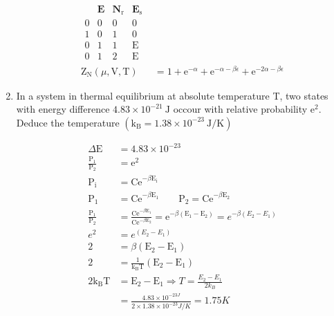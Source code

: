 \begin{enumerate}
 \begin{answer}
 	\begin{align*}
 	\begin{array}{llll} & \mathbf{E} & \mathbf{N}_{\mathrm{r}} & \mathbf{E}_{\mathrm{s}} \\ 0 & 0 & 0 & 0 \\ 1 & 0 & 1 & 0 \\ 0 & 1 & 1 & \mathrm{E} \\ 0 & 1 & 2 & \mathrm{E}\end{array}\\
 	\mathrm{Z}_{\mathrm{N}}(\mu, \mathrm{V}, \mathrm{T})&=1+\mathrm{e}^{-\alpha}+\mathrm{e}^{-\alpha-\beta \epsilon}+\mathrm{e}^{-2 \alpha-\beta \epsilon}
 	\end{align*}
 \end{answer}
	\item In a system in thermal equilibrium at absolute temperature T, two states with energy difference $4.83 \times 10^{-21} \mathrm{~J}$ occour with relative probability $\mathrm{e}^{2}$. Deduce the temperature $\left(\mathrm{k}_{\mathrm{B}}=1.38 \times 10^{-23} \mathrm{~J} / \mathrm{K}\right)$
	\begin{answer}
		\begin{align*}
		\Delta \mathrm{E}&=4.83 \times 10^{-23}\\
		\frac{\mathrm{P}_{1}}{\mathrm{P}_{2}}&=\mathrm{e}^{2}\\
		\mathrm{P}_{\mathrm{i}}&=\mathrm{Ce}^{-\beta \mathrm{E}_{\mathrm{i}}}\\
		\mathrm{P}_{1}&=\mathrm{Ce}^{-\beta \mathrm{E}_{1}}\qquad \mathrm{P}_{2}=\mathrm{Ce}^{-\beta \mathrm{E}_{2}}\\
		\frac{\mathrm{P}_{1}}{\mathrm{P}_{2}}&=\frac{\mathrm{Ce}^{-\beta \mathrm{E}_{1}}}{\mathrm{Ce}^{-\beta \mathrm{E}_{2}}}=\mathrm{e}^{-\beta\left(\mathrm{E}_{1}-\mathrm{E}_{2}\right)}=e^{-\beta (E_2-E_1)}\\
		e^{2}&=e^{\left(E_{2}-E_{1}\right)}\\
		2&=\beta\left(\mathrm{E}_{2}-\mathrm{E}_{1}\right)\\
		2&=\frac{1}{\mathrm{k}_{\mathrm{B}} \mathrm{T}}\left(\mathrm{E}_{2}-\mathrm{E}_{1}\right)\\
		2 \mathrm{k}_{\mathrm{B}} \mathrm{T}&=\mathrm{E}_{2}-\mathrm{E}_{1}\Rightarrow T=\frac{E_2-E_1}{2k_B}\\
		&=\frac{4.83 \times 10^{-23J}}{2 \times 1.38 \times 10^{-23}J/K}=1.75 K
		\end{align*}
	\end{answer}

\end{enumerate}

